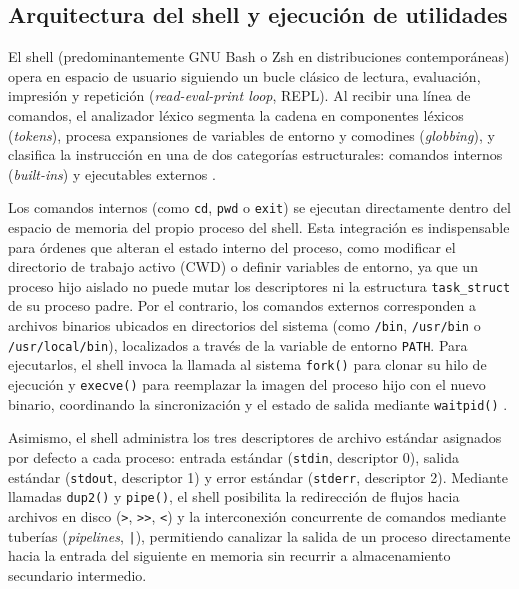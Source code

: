 \documentclass[12pt]{article}
\begin{document}
\subsection{Arquitectura del shell y ejecución de utilidades}
\label{subsec:arquitecturaShellEjecucion}

El shell (predominantemente GNU Bash o Zsh en distribuciones contemporáneas) opera en espacio de usuario siguiendo un bucle clásico de lectura, evaluación, impresión y repetición (\textit{read-eval-print loop}, REPL). Al recibir una línea de comandos, el analizador léxico segmenta la cadena en componentes léxicos (\textit{tokens}), procesa expansiones de variables de entorno y comodines (\textit{globbing}), y clasifica la instrucción en una de dos categorías estructurales: comandos internos (\textit{built-ins}) y ejecutables externos \parencite[\S 2.4, p.\ 48]{carretero2001sistemas}.

Los comandos internos (como \texttt{cd}, \texttt{pwd} o \texttt{exit}) se ejecutan directamente dentro del espacio de memoria del propio proceso del shell. Esta integración es indispensable para órdenes que alteran el estado interno del proceso, como modificar el directorio de trabajo activo (CWD) o definir variables de entorno, ya que un proceso hijo aislado no puede mutar los descriptores ni la estructura \texttt{task\_struct} de su proceso padre. Por el contrario, los comandos externos corresponden a archivos binarios ubicados en directorios del sistema (como \texttt{/bin}, \texttt{/usr/bin} o \texttt{/usr/local/bin}), localizados a través de la variable de entorno \texttt{PATH}. Para ejecutarlos, el shell invoca la llamada al sistema \texttt{fork()} para clonar su hilo de ejecución y \texttt{execve()} para reemplazar la imagen del proceso hijo con el nuevo binario, coordinando la sincronización y el estado de salida mediante \texttt{waitpid()} \parencite[\S 3.2, p.\ 120]{stallings2018operating}.

Asimismo, el shell administra los tres descriptores de archivo estándar asignados por defecto a cada proceso: entrada estándar (\texttt{stdin}, descriptor 0), salida estándar (\texttt{stdout}, descriptor 1) y error estándar (\texttt{stderr}, descriptor 2). Mediante llamadas \texttt{dup2()} y \texttt{pipe()}, el shell posibilita la redirección de flujos hacia archivos en disco (\texttt{>}, \texttt{>>}, \texttt{<}) y la interconexión concurrente de comandos mediante tuberías (\textit{pipelines}, \texttt{|}), permitiendo canalizar la salida de un proceso directamente hacia la entrada del siguiente en memoria sin recurrir a almacenamiento secundario intermedio.
\end{document}
